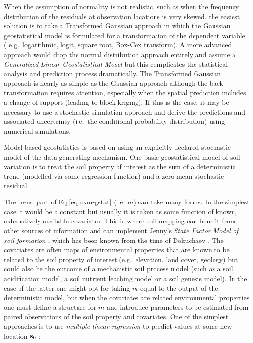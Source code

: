 \documentclass[11pt]{krantz}
\theoremstyle{definition}
\theoremstyle{definition}
\theoremstyle{definition}
\theoremstyle{remark}
\begin{document}
When the assumption of normality is not realistic, such as when the
frequency distribution of the residuals at observation locations is very
skewed, the easiest solution is to take a Transformed Gaussian approach
\citep[ \$\S\$3.8]{Diggle2007Springer} in which the Gaussian
geostatistical model is formulated for a transformation of the dependent
variable ( e.g.~logarithmic, logit, square root, Box-Cox transform). A
more advanced approach would drop the normal distribution approach
entirely and assume a \emph{Generalized Linear Geostatistical Model}
\citep{Diggle2007Springer, Brown2014JSS} but this complicates the
statistical analysis and prediction process dramatically. The
Transformed Gaussian approach is nearly as simple as the Gaussian
approach although the back-transformation requires attention, especially
when the spatial prediction includes a change of support (leading to
block kriging). If this is the case, it may be necessary to use a
stochastic simulation approach and derive the predictions and associated
uncertainty (i.e.~the conditional probability distribution) using
numerical simulations.

Model-based geostatistics is based on using an explicitly declared
stochastic model of the data generating mechanism. One basic
geostatistical model of soil variation is to treat the soil property of
interest as the sum of a deterministic trend (modelled via some
regression function) and a zero-mean stochastic residual.

The trend part of Eq.\eqref{eq:ukm-gstat} (i.e. \(m\)) can take many
forms. In the simplest case it would be a constant but usually it is
taken as some function of known, exhaustively available covariates. This
is where soil mapping can benefit from other sources of information and
can implement Jenny's \emph{State Factor Model of soil formation}
\citep{Jenny1968, jenny1994factors, Heuvelink2001Geoderma, McBratney2011HSS},
which has been known from the time of Dokuchaev
\citep{Florinsky2012Dokuchaev}. The covariates are often maps of
environmental properties that are known to be related to the soil
property of interest (e.g.~elevation, land cover, geology) but could
also be the outcome of a mechanistic soil process model (such as a soil
acidification model, a soil nutrient leaching model or a soil genesis
model). In the case of the latter one might opt for taking \(m\) equal
to the output of the deterministic model, but when the covariates are
related environmental properties one must define a structure for \(m\)
and introduce parameters to be estimated from paired observations of the
soil property and covariates. One of the simplest approaches is to use
\emph{multiple linear regression} to predict values at some new location
\({\bf{s}}_0\) \citep{kutner2005applied}:
\end{document}

